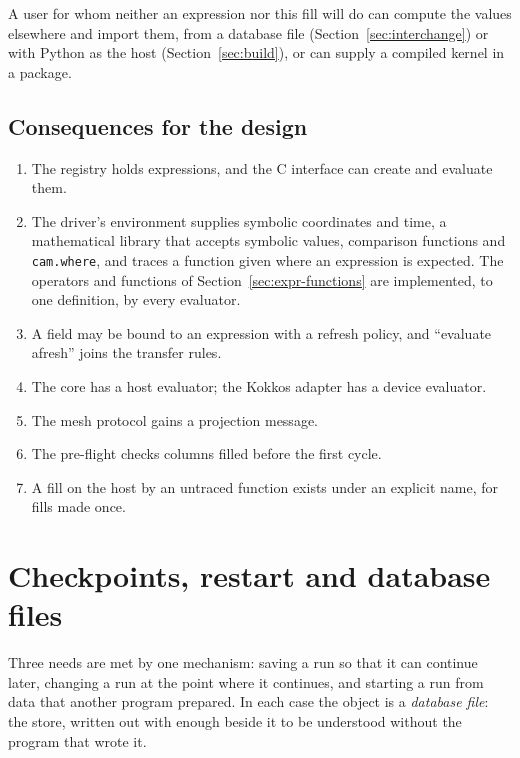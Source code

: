 \documentclass[11pt,a4paper]{article}
\newcommand{\code}[1]{\texttt{#1}}
\begin{document}
A user for whom neither an expression nor this fill will do can compute the
values elsewhere and import them, from a database file
(Section~\ref{sec:interchange}) or with Python as the host
(Section~\ref{sec:build}), or can supply a compiled kernel in a package.

\subsection{Consequences for the design}

\begin{enumerate}
  \item The registry holds expressions, and the C interface can create and
        evaluate them.
  \item The driver's environment supplies symbolic coordinates and time, a
        mathematical library that accepts symbolic values, comparison
        functions and \code{cam.where}, and traces a function given where
        an expression is expected.  The operators and functions of
        Section~\ref{sec:expr-functions} are implemented, to one
        definition, by every evaluator.
  \item A field may be bound to an expression with a refresh policy, and
        \enquote{evaluate afresh} joins the transfer rules.
  \item The core has a host evaluator; the Kokkos adapter has a device
        evaluator.
  \item The mesh protocol gains a projection message.
  \item The pre-flight checks columns filled before the first cycle.
  \item A fill on the host by an untraced function exists under an explicit
        name, for fills made once.
\end{enumerate}

\section{Checkpoints, restart and database files}
\label{sec:checkpoint}

Three needs are met by one mechanism: saving a run so that it can continue
later, changing a run at the point where it continues, and starting a run
from data that another program prepared.  In each case the object is a
\emph{database file}: the store, written out with enough beside it to be
understood without the program that wrote it.
\end{document}
